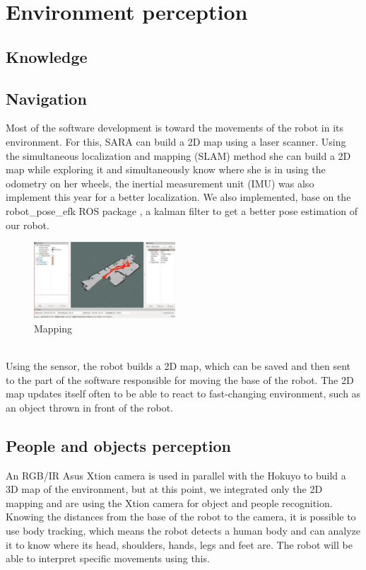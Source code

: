 \documentclass[runningheads,a4paper]{llncs}
\begin{document}
\section{Environment perception}

\subsection{Knowledge}

\subsection{Navigation}
\tab Most of the software development is toward the movements of the robot in its environment. For this, SARA can build a 2D map using a laser scanner. Using the simultaneous localization and mapping (SLAM) method she can build a 2D map while exploring it and simultaneously know where she is in using the odometry on her wheels, the inertial measurement unit (IMU) was also implement this year for a better localization. We also implemented, base on the robot\_pose\_efk ROS package \cite{poseefk}, a kalman filter to get a better pose estimation of our robot. \\
\begin{figure}
  \centering
  \includegraphics[width=150pt]{images/map.jpg}
  \caption{Mapping}
\end{figure}\\
Using the sensor, the robot builds a 2D map, which can be saved and then sent to the part of the software responsible for moving the base of the robot. The 2D map updates itself often to be able to react to fast-changing environment, such as an object thrown in front of the robot.


\subsection{People and objects perception}
\tab An RGB/IR Asus Xtion camera is used in parallel with the Hokuyo to build a 3D map of the environment, but at this point, we integrated only the 2D mapping and are using the Xtion camera for object and people recognition. Knowing the distances from the base of the robot to the camera, it is possible to use body tracking, which means the robot detects a human body and can analyze it to know where its head, shoulders, hands, legs and feet are. The robot will be able to interpret specific movements using this. \\
\end{document}
